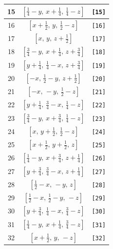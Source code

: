 \documentclass[fleqn,8pt]{jsarticle}
\begin{document}
\begin{longtable}{ccc}
15 & $\left[ \frac{1}{4} - y,\, x + \frac{1}{4},\, \frac{1}{4} - z \right]$ & {\tt [15]} \\ \hline
16 & $\left[ x + \frac{1}{2},\, y,\, \frac{1}{2} - z \right]$ & {\tt [16]} \\ \hline
17 & $\left[ x,\, y,\, z + \frac{1}{2} \right]$ & {\tt [17]} \\ \hline
18 & $\left[ \frac{3}{4} - y,\, x + \frac{1}{4},\, z + \frac{3}{4} \right]$ & {\tt [18]} \\ \hline
19 & $\left[ y + \frac{1}{4},\, \frac{1}{4} - x,\, z + \frac{3}{4} \right]$ & {\tt [19]} \\ \hline
20 & $\left[ - x,\, \frac{1}{2} - y,\, z + \frac{1}{2} \right]$ & {\tt [20]} \\ \hline
21 & $\left[ - x,\, - y,\, \frac{1}{2} - z \right]$ & {\tt [21]} \\ \hline
22 & $\left[ y + \frac{1}{4},\, \frac{3}{4} - x,\, \frac{1}{4} - z \right]$ & {\tt [22]} \\ \hline
23 & $\left[ \frac{3}{4} - y,\, x + \frac{3}{4},\, \frac{1}{4} - z \right]$ & {\tt [23]} \\ \hline
24 & $\left[ x,\, y + \frac{1}{2},\, \frac{1}{2} - z \right]$ & {\tt [24]} \\ \hline
25 & $\left[ x + \frac{1}{2},\, y + \frac{1}{2},\, z \right]$ & {\tt [25]} \\ \hline
26 & $\left[ \frac{1}{4} - y,\, x + \frac{3}{4},\, z + \frac{1}{4} \right]$ & {\tt [26]} \\ \hline
27 & $\left[ y + \frac{3}{4},\, \frac{3}{4} - x,\, z + \frac{1}{4} \right]$ & {\tt [27]} \\ \hline
28 & $\left[ \frac{1}{2} - x,\, - y,\, z \right]$ & {\tt [28]} \\ \hline
29 & $\left[ \frac{1}{2} - x,\, \frac{1}{2} - y,\, - z \right]$ & {\tt [29]} \\ \hline
30 & $\left[ y + \frac{3}{4},\, \frac{1}{4} - x,\, \frac{3}{4} - z \right]$ & {\tt [30]} \\ \hline
31 & $\left[ \frac{1}{4} - y,\, x + \frac{1}{4},\, \frac{3}{4} - z \right]$ & {\tt [31]} \\ \hline
32 & $\left[ x + \frac{1}{2},\, y,\, - z \right]$ & {\tt [32]} \\
\end{longtable}
\end{document}
